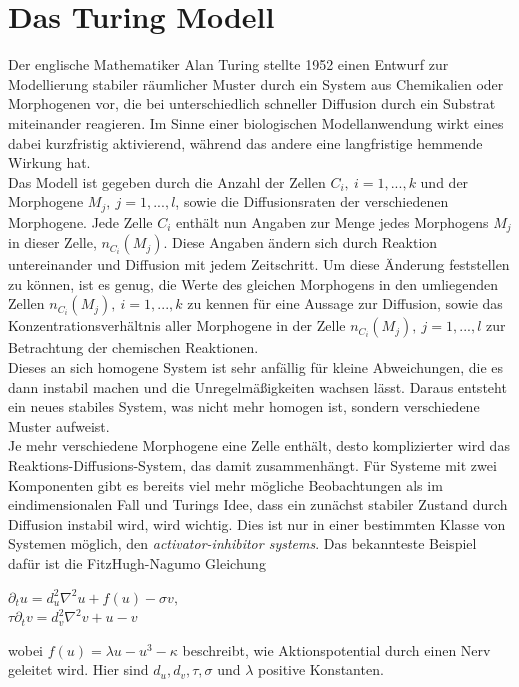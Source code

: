 \documentclass[]{article}
\begin{document}
\section{Das Turing Modell}

Der englische Mathematiker Alan Turing stellte 1952 einen Entwurf zur Modellierung stabiler r\"aumlicher Muster durch ein System aus Chemikalien oder Morphogenen vor, die bei unterschiedlich schneller Diffusion durch ein Substrat miteinander reagieren. Im Sinne einer biologischen Modellanwendung wirkt eines dabei kurzfristig aktivierend, w\"ahrend das andere eine langfristige hemmende Wirkung hat. \\

Das Modell ist gegeben durch die Anzahl der Zellen $C_i,~i=1,...,k$ und der  Morphogene $M_j, ~j=1,...,l$, sowie die Diffusionsraten der verschiedenen Morphogene. Jede Zelle $C_i$ enth\"alt nun Angaben zur Menge jedes Morphogens $M_j$ in dieser Zelle, $n_{C_i}(M_j)$. Diese Angaben \"andern sich durch Reaktion untereinander und Diffusion mit jedem Zeitschritt. Um diese \"Anderung feststellen zu k\"onnen, ist es genug, die Werte des gleichen Morphogens in den umliegenden Zellen $n_{C_i}(M_j), ~i=1,...,k$ zu kennen f\"ur eine Aussage zur Diffusion, sowie das Konzentrationsverh\"altnis aller Morphogene in der Zelle $n_{C_i}(M_j), ~j=1,...,l$ zur Betrachtung der chemischen Reaktionen. \\

Dieses an sich homogene System ist sehr anf\"allig f\"ur kleine Abweichungen, die es dann instabil machen und die Unregelm\"a\ss igkeiten wachsen l\"asst. Daraus entsteht ein neues stabiles System, was nicht mehr homogen ist, sondern verschiedene Muster aufweist. \\

Je mehr verschiedene Morphogene eine Zelle enth\"alt, desto komplizierter wird das Reaktions-Diffusions-System, das damit zusammenh\"angt.
F\"ur Systeme mit zwei Komponenten gibt es bereits viel mehr m\"ogliche Beobachtungen als im eindimensionalen Fall und Turings Idee, dass ein zun\"achst stabiler Zustand durch Diffusion instabil wird, wird wichtig.
Dies ist nur in einer bestimmten Klasse von Systemen m\"oglich, den \textit{activator-inhibitor systems}. Das bekannteste Beispiel daf\"ur ist die FitzHugh-Nagumo Gleichung 
	\begin{center}
	$\partial_t u = d^2_u \nabla^2 u + f(u) -\sigma v, $\\
	$\tau \partial_t v = d^2_v \nabla^2 v + u - v  $
	\end{center}
wobei $ f(u) = \lambda u - u^3 - \kappa $ beschreibt, wie Aktionspotential durch einen Nerv geleitet wird. Hier sind $ d_u, d_v, \tau, \sigma $ und $\lambda $ positive Konstanten.
\end{document}
